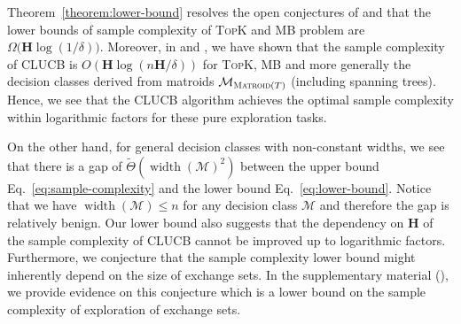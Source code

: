 \documentclass{article}
\newcommand{\Algorithm}{{\small \textsf{CLUCB}}\xspace}
\newcommand{\M}{\mathcal M}
\newcommand{\B}{\mathcal B}
\DeclareMathOperator{\rank}{width}
\newcommand{\MultiIdent}{\textsc{TopK}\xspace}
\newcommand{\MultiBandit}{\textsc{MB}\xspace}
\newcommand{\Matroid}{\textsc{Matroid}\xspace}
\newcommand{\Match}{\textsc{Match}\xspace}
\newcommand{\Path}{\textsc{Path}\xspace}
\begin{document}
Theorem~\ref{theorem:lower-bound} resolves the open conjectures of \citet{kalyanakrishnan2012pac} and \citet{bubeck2013multiple} that the lower bounds of sample complexity of \MultiIdent and \MultiBandit problem are $\Omega\big(\mathbf H\log(1/\delta)\big)$.
Moreover, in  and , we have shown that the sample complexity of \Algorithm is $O(\mathbf H\log(n\mathbf H/\delta))$ for \MultiIdent, \MultiBandit and more generally the decision classes derived from matroids $\M_{\Matroid(T)}$ (including spanning trees).
Hence, we see that the \Algorithm algorithm achieves the optimal sample complexity within logarithmic factors for these pure exploration tasks.

On the other hand, for general decision classes with non-constant widths, we see that there is a gap of $\tilde \Theta(\rank(\M)^2)$ between the upper bound Eq.~\eqref{eq:sample-complexity} and the lower bound Eq.~\eqref{eq:lower-bound}.
Notice that we have $\rank(\M) \le n$ for any decision class $\M$ and therefore the gap is relatively benign.
Our lower bound also suggests that the dependency on $\mathbf H$ of the sample complexity of \Algorithm cannot be improved up to logarithmic factors.
Furthermore, we conjecture that the sample complexity lower bound might inherently depend on the size of exchange sets. 
In the supplementary material (), we provide evidence on this conjecture which is a lower bound on the sample complexity of exploration of exchange sets.
\end{document}
